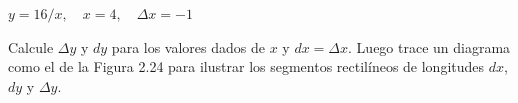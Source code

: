 \item $y = 16/x, \quad x = 4, \quad \Delta x = -1$
\par
Calcule $\Delta y$ y $dy$ para los valores dados de $x$ y $dx = \Delta x$. Luego trace un diagrama como el de la Figura 2.24 para ilustrar los segmentos rectilíneos de longitudes $dx$, $dy$ y $\Delta y$.
